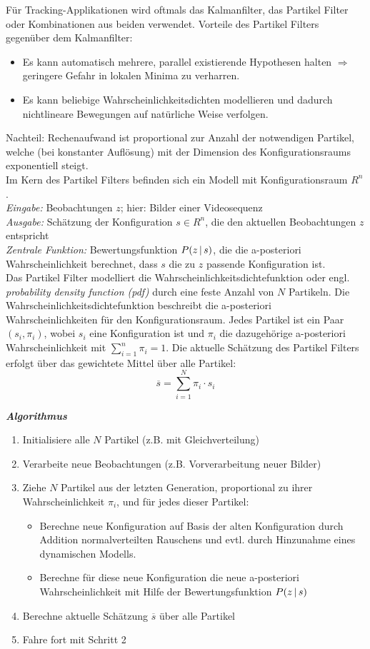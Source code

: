 Für Tracking-Applikationen wird oftmals das Kalmanfilter, das Partikel Filter oder Kombinationen aus beiden verwendet. Vorteile des Partikel Filters gegenüber dem Kalmanfilter:
\begin{itemize}
\item Es kann automatisch mehrere, parallel existierende Hypothesen halten $\Rightarrow$ geringere Gefahr in lokalen Minima zu verharren.
\item Es kann beliebige Wahrscheinlichkeitsdichten modellieren und dadurch nichtlineare Bewegungen auf natürliche Weise verfolgen.
\end{itemize}
Nachteil: Rechenaufwand ist proportional zur Anzahl der notwendigen Partikel, welche (bei konstanter Auflösung) mit der Dimension des Konfigurationsraums exponentiell steigt. \\ Im Kern des Partikel Filters befinden sich ein Modell mit Konfigurationsraum $R^n$. \\ \textit{Eingabe:} Beobachtungen $z$; hier: Bilder einer Videosequenz \\ \textit{Ausgabe:} Schätzung der Konfiguration $s \in R^n$, die den aktuellen Beobachtungen $z$ entspricht \\ \textit{Zentrale Funktion:} Bewertungsfunktion $P(z \, | \, s)$, die die a-posteriori Wahrscheinlichkeit berechnet, dass $s$ die zu $z$ passende Konfiguration ist. \\
Das Partikel Filter modelliert die Wahrscheinlichkeitsdichtefunktion oder engl. \textsl{probability density function (pdf)} durch eine feste Anzahl von $N$ Partikeln. Die Wahrscheinlichkeitsdichtefunktion beschreibt die a-posteriori Wahrscheinlichkeiten für den Konfigurationsraum. Jedes Partikel ist ein Paar $(s_i, \pi_i)$, wobei $s_i$ eine Konfiguration ist und $\pi_i$ die dazugehörige a-posteriori Wahrscheinlichkeit mit $\sum_{i=1}^n \pi_i = 1$. Die aktuelle Schätzung des Partikel Filters erfolgt über das gewichtete Mittel über alle Partikel: $$\overline{s} = \sum\limits_{i=1}^{N} \pi_i \cdot s_i$$

\textbf{\textsl{Algorithmus}}

\begin{enumerate}
\item Initialisiere alle $N$ Partikel (z.B. mit Gleichverteilung)
\item Verarbeite neue Beobachtungen (z.B. Vorverarbeitung neuer Bilder)
\item Ziehe $N$ Partikel aus der letzten Generation, proportional zu ihrer Wahrscheinlichkeit $\pi_i$, und für jedes dieser Partikel:
\begin{itemize}
\item Berechne neue Konfiguration auf Basis der alten Konfiguration durch Addition normalverteilten Rauschens und evtl. durch Hinzunahme eines dynamischen Modells.
\item Berechne für diese neue Konfiguration die neue a-posteriori Wahrscheinlichkeit mit Hilfe der Bewertungsfunktion $P(z \, | \, s)$
\end{itemize}
\item Berechne aktuelle Schätzung $\overline{s}$ über alle Partikel
\item Fahre fort mit Schritt 2
\end{enumerate}

